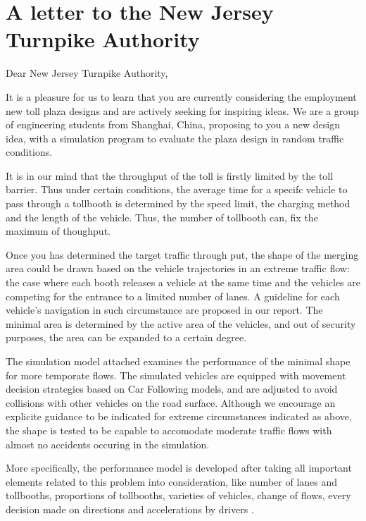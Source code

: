 \documentclass{mcmthesis}
\begin{document}
\maketitle
\tableofcontents
\clearpage





\section{A letter to the New Jersey Turnpike Authority}


Dear New Jersey Turnpike Authority,

It is a pleasure for us to learn that you are currently considering the employment new toll plaza designs and are actively seeking for inspiring ideas. We are a group of engineering students from Shanghai, China, proposing to you a new design idea, with a simulation program to evaluate the plaza design in random traffic conditions. 

It is in our mind that the throughput of the toll is firstly limited by the toll barrier. Thus under certain conditions, the average time for a specifc vehicle to pass through a tollbooth is determined by the speed limit, the charging method and the length of the vehicle. Thus, the number of tollbooth can, fix the maximum of thoughput. 

Once you has determined the target traffic through put, the shape of the merging area could be drawn based on the vehicle trajectories in an extreme traffic flow: the case where each booth releases a vehicle at the same time and the vehicles are competing for the entrance to a limited number of lanes. A guideline for each vehicle's navigation in such circumstance are proposed in our report. The minimal area is determined by the active area of the vehicles, and out of security purposes, the area can be expanded to a certain degree.

The simulation model attached examines the performance of the minimal shape for more temporate flows. The simulated vehicles are equipped with movement decision strategies based on Car Following models, and are adjusted to avoid collisions with other vehicles on the road surface. Although we encourage an explicite guidance to be indicated for extreme circumstances indicated as above, the shape is tested to be capable to accomodate moderate traffic flows with almost no accidents occuring in the simulation.

More specifically, the performance model is developed after taking all important elements related to this problem into consideration, like number of lanes and tollbooths, proportions of tollbooths, varieties of vehicles, change of flows, every decision made on directions and accelerations by drivers . 
\end{document}
